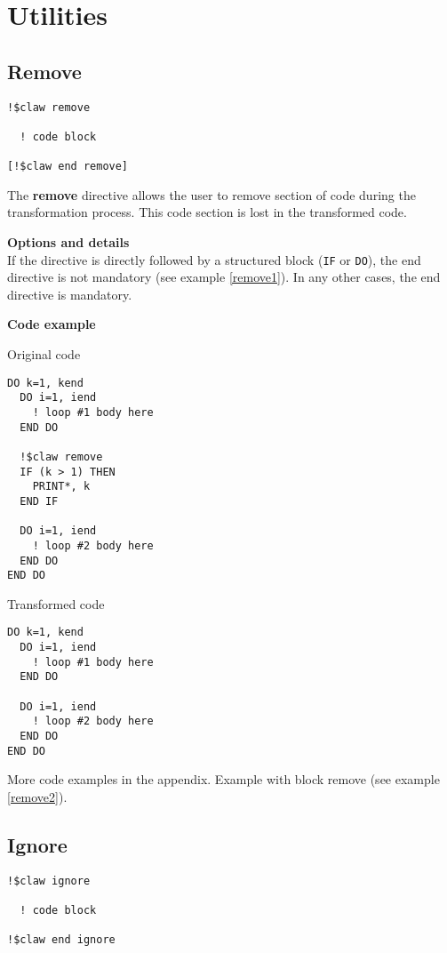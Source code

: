 \section{Utilities}

\subsection{Remove}
\begin{lstlisting}
!$claw remove

  ! code block
  
[!$claw end remove]
\end{lstlisting}

The \textbf{remove} directive allows the user to remove section of code
during the transformation process. This code section is lost in the 
transformed code.

\textbf{Options and details}\\
If the directive is directly followed by a structured block (\lstinline!IF! or \lstinline!DO!), the
end directive is not mandatory (see example \ref{remove1}). In any other cases, the end
directive is mandatory.

\textbf{Code example}
\label{remove1}

Original code
\begin{lstlisting}
DO k=1, kend
  DO i=1, iend
    ! loop #1 body here
  END DO

  !$claw remove
  IF (k > 1) THEN
    PRINT*, k
  END IF

  DO i=1, iend
    ! loop #2 body here
  END DO
END DO
\end{lstlisting}

Transformed code
\begin{lstlisting}
DO k=1, kend
  DO i=1, iend
    ! loop #1 body here
  END DO

  DO i=1, iend
    ! loop #2 body here
  END DO
END DO
\end{lstlisting}

More code examples in the appendix. Example with block remove (see example \ref{remove2}).


\subsection{Ignore}
\begin{lstlisting}
!$claw ignore

  ! code block
  
!$claw end ignore
\end{lstlisting}

